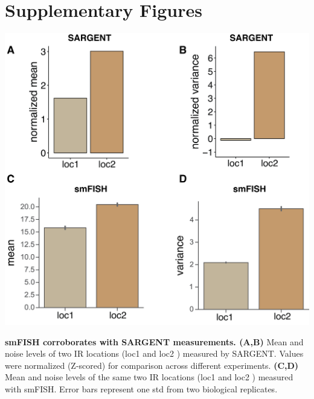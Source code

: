 \clearpage
\section{Supplementary Figures}


\begin{suppfigure}[t]  
    \centering
    \includegraphics[width=\linewidth]{figures/cas/cas_suppfigure1.png}
    \caption[smFISH corroborates with SARGENT measurements.]{
        \textbf{smFISH corroborates with SARGENT measurements. (A,B)}
        Mean and noise levels of two IR locations (loc1  and loc2 ) measured by SARGENT. Values were normalized (Z-scored) for comparison across different experiments.
        \textbf{(C,D)}
        Mean and noise levels of the same two IR locations (loc1  and loc2 ) measured with smFISH. Error bars represent one std from two biological replicates. 
    }
    \label{fig:cas_figureS1}
\end{suppfigure}


